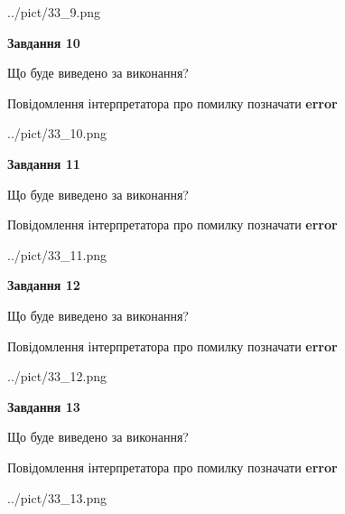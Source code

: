 \documentclass[11pt, ukrainian]{article}
\begin{document}
{\begin {large}
\begin{center}
	{../pict/33_9.png}
\end{center}
\newpage

{\begin {center}\textbf{Завдання 10}\end {center}}\par
Що буде виведено за виконання? \par
Повідомлення інтерпретатора про помилку позначати \textbf{error}

\begin{center}
	{../pict/33_10.png}
\end{center}
\newpage

{\begin {center}\textbf{Завдання 11}\end {center}}\par
Що буде виведено за виконання? \par
Повідомлення інтерпретатора про помилку позначати \textbf{error}

\begin{center}
	{../pict/33_11.png}
\end{center}
\newpage

{\begin {center}\textbf{Завдання 12}\end {center}}\par
Що буде виведено за виконання? \par
Повідомлення інтерпретатора про помилку позначати \textbf{error}

\begin{center}
	{../pict/33_12.png}
\end{center}
\newpage

{\begin {center}\textbf{Завдання 13}\end {center}}\par
Що буде виведено за виконання? \par
Повідомлення інтерпретатора про помилку позначати \textbf{error}

\begin{center}
	{../pict/33_13.png}
\end{center}
\newpage


\end{large}}
\end{document}
